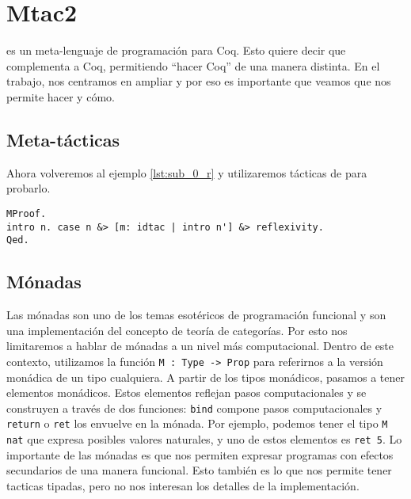 \chapter{Mtac2}\label{ch:mtac2}

\Mtac \cite{DBLP:journals/pacmpl/KaiserZKRD18} es un meta-lenguaje de programación para Coq. Esto quiere decir que complementa a Coq, permitiendo ``hacer Coq'' de una manera distinta. En el trabajo, nos centramos en ampliar \Mtac y por eso es importante que veamos que nos permite hacer y cómo.

\section{Meta-tácticas}

Ahora volveremos al ejemplo \ref{lst:sub_0_r} y utilizaremos tácticas de \Mtac para probarlo.

\begin{lstlisting}[frame=tb,caption={Prueba en \Mtac},label=lst:sub_0_r_mtac2]
MProof.
intro n. case n &> [m: idtac | intro n'] &> reflexivity.
Qed.
\end{lstlisting}

\section{Mónadas}

Las mónadas son uno de los temas esotéricos de programación funcional y son una implementación del concepto de teoría de categorías.
Por esto nos limitaremos a hablar de mónadas a un nivel más computacional. Dentro de este contexto, utilizamos la función \lstinline{M : Type -> Prop} para referirnos a la versión monádica de un tipo cualquiera. A partir de los tipos monádicos, pasamos a tener elementos monádicos. Estos elementos reflejan pasos computacionales y se construyen a través de dos funciones: \lstinline{bind} compone pasos computacionales y \lstinline{return} o \lstinline{ret} los envuelve en la mónada. Por ejemplo, podemos tener el tipo \lstinline{M nat} que expresa posibles valores naturales, y uno de estos elementos es \lstinline{ret 5}. Lo importante de las mónadas es que nos permiten expresar programas con efectos secundarios de una manera funcional.
Esto también es lo que nos permite tener tacticas tipadas, pero no nos interesan los detalles de la implementación.

